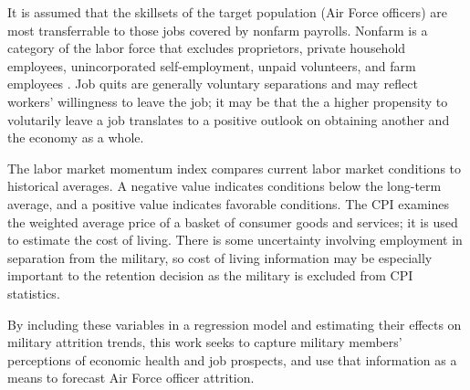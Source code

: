 \documentclass[12pt,letterpaper,toc=flat,oneside]{report}
\theoremstyle{definition}
\theoremstyle{definition}
\theoremstyle{definition}
\theoremstyle{remark}
\begin{document}
It is assumed that the skillsets of the target population (Air Force
officers) are most transferrable to those jobs covered by nonfarm
payrolls. Nonfarm is a category of the labor force that excludes
proprietors, private household employees, unincorporated
self-employment, unpaid volunteers, and farm employees
\cite{fred-nonfarm-2017}. Job quits are generally voluntary separations
and may reflect workers' willingness to leave the job; it may be that
the a higher propensity to volutarily leave a job translates to a
positive outlook on obtaining another and the economy as a whole.

The labor market momentum index compares current labor market conditions
to historical averages. A negative value indicates conditions below the
long-term average, and a positive value indicates favorable conditions.
The CPI examines the weighted average price of a basket of consumer
goods and services; it is used to estimate the cost of living. There is
some uncertainty involving employment in separation from the military,
so cost of living information may be especially important to the
retention decision as the military is excluded from CPI statistics.

By including these variables in a regression model and estimating their
effects on military attrition trends, this work seeks to capture
military members' perceptions of economic health and job prospects, and
use that information as a means to forecast Air Force officer attrition.

\begin{table}

\caption{\label{tab:econ-var}Selected Economic Indicators}
\centering
{}
\end{table}
\end{document}
